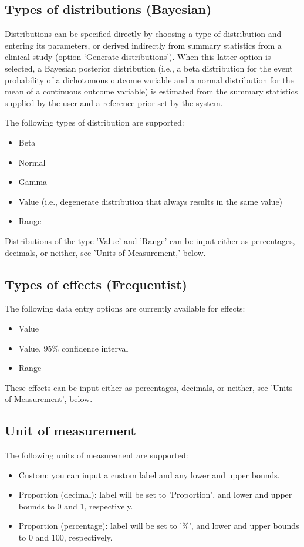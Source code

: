 \documentclass[00_mcda_tutorial.tex]{subfiles}
\begin{document}
\subsection*{Types of distributions (Bayesian)}
Distributions can be specified directly by choosing a type of distribution and entering its parameters, or derived indirectly from summary statistics from a clinical study (option ‘Generate distributions’). When this latter option is selected, a Bayesian posterior distribution (i.e., a beta distribution for the event probability of a dichotomous outcome variable and a normal distribution for the mean of a continuous outcome variable) is estimated from the summary statistics supplied by the user and a reference prior set by the system.
\newline

\noindent The following types of distribution are supported:
\begin{itemize}
    \item Beta
    \item Normal
    \item Gamma
    \item Value (i.e., degenerate distribution that always results in the same value)
    \item Range
\end{itemize}

\noindent Distributions of the type 'Value' and 'Range' can be input either as percentages, decimals, or neither, see 'Units of Measurement,' below.

\subsection*{Types of effects (Frequentist)}
The following data entry options are currently available for effects:
\begin{itemize}
    \item Value
    \item Value, 95\% confidence interval
    \item Range
\end{itemize}

\noindent These effects can be input either as percentages, decimals, or neither, see 'Units of Measurement', below.

\subsection*{Unit of measurement}
\label{sec:uom}
The following units of measurement are supported:
\begin{itemize}
    \item Custom: you can input a custom label and any lower and upper bounds.
    \item Proportion (decimal): label will be set to 'Proportion', and lower and upper bounds to 0 and 1, respectively.
    \item Proportion (percentage): label will be set to '\%', and lower and upper bounds to 0 and 100, respectively.
\end{itemize}
\end{document}
